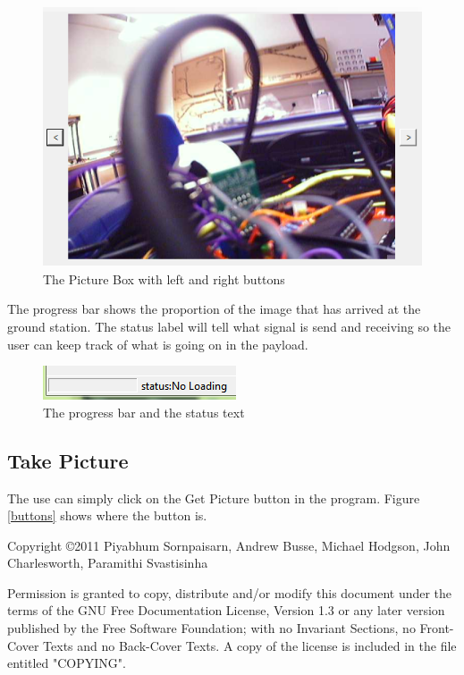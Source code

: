 \documentclass[a4paper,11pt]{article}
\begin{document}
\begin{figure}[!htbp]
\begin{center}
\includegraphics[scale=1]{leftRight.PNG}   
\caption{The Picture Box with left and right buttons \label{leftRight}}
\end{center}
\end{figure}

The progress bar shows the proportion of the image that has arrived at the ground station. The status label will tell what signal is send and receiving so the user can keep track of what is going on in the payload.

\begin{figure}[!htbp]
\begin{center}
\includegraphics[scale=1]{progress_bar.PNG} 
\caption{The progress bar and the status text \label{progressBar}}
\end{center}
\end{figure}

\subsection{Take Picture}

The use can simply click on the Get Picture button in the program. Figure \ref{buttons} shows where the button is.

Copyright \copyright 2011 Piyabhum Sornpaisarn, Andrew Busse, Michael Hodgson, John Charlesworth, Paramithi Svastisinha

Permission is granted to copy, distribute and/or modify this
document under the terms of the GNU Free Documentation License,
Version 1.3 or any later version published by the Free Software
Foundation; with no Invariant Sections, no Front-Cover Texts and
no Back-Cover Texts.  A copy of the license is included in the
file entitled "COPYING".
\end{document}
